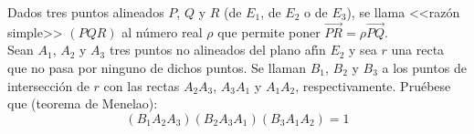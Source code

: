 \begin{enunciado}
 Dados tres puntos alineados $P$, $Q$ y $R$ (de $E_1$, de $E_2$ o de $E_3$), se llama <<raz\'on simple>> $(PQR)$ al n\'umero real $\rho$ que permite poner $\overrightarrow{PR} = \rho\overrightarrow{PQ}$. \\
 Sean $A_1$, $A_2$ y $A_3$ tres puntos no alineados del plano af\'{\i}n $E_2$ y sea $r$ una recta que no pasa por ninguno de dichos puntos. Se llaman $B_1$, $B_2$ y $B_3$ a los puntos de intersecci\'on de $r$ con las rectas $A_2A_3$, $A_3A_1$ y $A_1A_2$, respectivamente. Pru\'ebese que (teorema de Menelao):
 \begin{equation*}
  \left( B_1A_2A_3 \right)\left( B_2A_3A_1 \right)\left( B_3A_1A_2 \right) = 1
 \end{equation*}
\end{enunciado}

